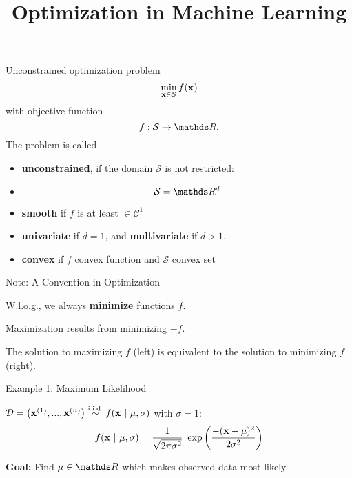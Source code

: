 \documentclass[11pt,compress,t,notes=noshow, xcolor=table]{beamer}
\title{Optimization in Machine Learning}
\begin{document}

\begin{frame2}{Unconstrained optimization problem}
$$
\min_{\xv \in \mathcal{S}} \fx
$$
with objective function
$$
f: \mathcal{S} \to \R.
$$
The problem is called
\begin{itemize}
\item \textbf{unconstrained}, if the domain $\mathcal{S}$ is not restricted:
\item[] $$ \mathcal{S} = \R^d $$
\item \textbf{smooth} if $f$ is at least $\in \mathcal{C}^1$
\item \textbf{univariate} if $d = 1$, and \textbf{multivariate} if $d > 1$.
\item \textbf{convex} if $f$ convex function and $\mathcal{S}$ convex set
\end{itemize}
\end{frame2}


\begin{framei}[sep=L]{Note: A Convention in Optimization}
\item W.l.o.g., we always \textbf{minimize} functions $f$.
\item Maximization results from minimizing $-f$.
\vfill
{}
{
}
\item The solution to maximizing $f$ (left) is equivalent to the solution to minimizing $f$ (right).
\end{framei}


\begin{framei}{Example 1: Maximum Likelihood}
\item $\D = \left(\xi[1], ..., \xi[n]\right) \overset{\text{i.i.d.}}{\sim} f(\xv ~|~ \mu, \sigma)$ with $\sigma = 1$:
$$ f(\xv ~|~ \mu, \sigma) = \frac{1}{\sqrt{2 \pi \sigma^{2}}}~\exp\left(\frac{-(\xv-\mu)^{2}}{2\sigma^{2}}\right) $$
\item \textbf{Goal:} Find $\mu \in \R$ which makes observed data most likely.
\end{framei}
\end{document}
